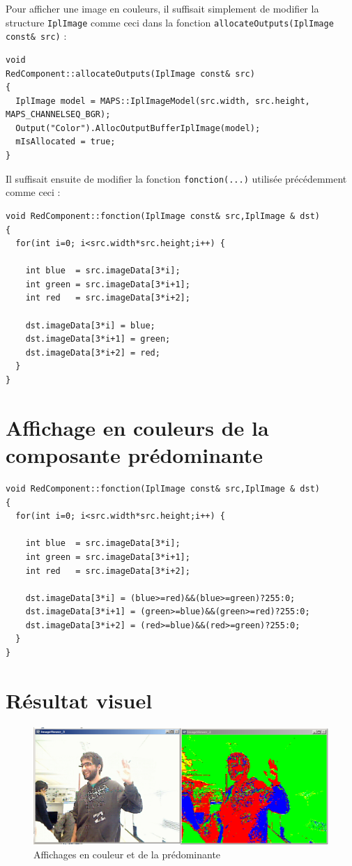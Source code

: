 Pour afficher une image en couleurs, il suffisait simplement de modifier la structure \lstinline{IplImage} comme ceci dans la fonction \lstinline{allocateOutputs(IplImage const& src)} :

\begin{lstlisting}
void
RedComponent::allocateOutputs(IplImage const& src)
{
  IplImage model = MAPS::IplImageModel(src.width, src.height, MAPS_CHANNELSEQ_BGR);
  Output("Color").AllocOutputBufferIplImage(model);
  mIsAllocated = true;
}
\end{lstlisting}
Il suffisait ensuite de modifier la fonction \lstinline{fonction(...)} utilisée précédemment comme ceci :
\begin{lstlisting}
void RedComponent::fonction(IplImage const& src,IplImage & dst)
{
  for(int i=0; i<src.width*src.height;i++) {

    int blue  = src.imageData[3*i];
    int green = src.imageData[3*i+1];
    int red   = src.imageData[3*i+2];
    
    dst.imageData[3*i] = blue;
    dst.imageData[3*i+1] = green;
    dst.imageData[3*i+2] = red;
  }
}
\end{lstlisting}

\section{Affichage en couleurs de la composante prédominante}
\begin{lstlisting}
void RedComponent::fonction(IplImage const& src,IplImage & dst)
{
  for(int i=0; i<src.width*src.height;i++) {

    int blue  = src.imageData[3*i];
    int green = src.imageData[3*i+1];
    int red   = src.imageData[3*i+2];
 
    dst.imageData[3*i] = (blue>=red)&&(blue>=green)?255:0;
    dst.imageData[3*i+1] = (green>=blue)&&(green>=red)?255:0;
    dst.imageData[3*i+2] = (red>=blue)&&(red>=green)?255:0;
  }
}
\end{lstlisting}

\section{Résultat visuel}

\begin{figure}[!h]
   \centering\includegraphics[width=1.0\textwidth]{pictures/couleurs.png}
   \caption{Affichages en couleur et de la prédominante}
\end{figure}